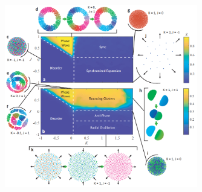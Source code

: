 \documentclass[10pt,aspectratio=43,mathserif,table]{beamer}
\begin{document}
\begin{frame}
    \begin{figure}
        \centering
        \includegraphics[width=0.75\textwidth]{fig2.jpg}
    \end{figure}



\end{frame}
\end{document}
